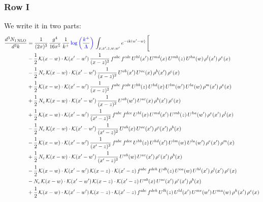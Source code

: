 \documentclass[9pt]{article}
\numberwithin{equation}{section}
\begin{document}
\subsubsection{Row I}
We write it in two parts: 
\begin{align}
\frac{d^{3}N_{1\,\mathrm{NLO}}}{d^{3}k} & = \frac{1}{(2\pi)^{3}}\,\frac{g^{4}}{16\pi^{5}}\,\frac{1}{k^{+}}\,{\color{blue}\log{\left(\frac{k^{+}}{\Lambda}\right)}}\,\int_{x,x',z,w,w'}e^{-ik(w'-w)}\,\Bigg[\notag\\ & -\frac{1}{2}\,\mathcal{K}(x-w)\cdot\mathcal{K}(x'-w')\,\frac{1}{(x-z)^{2}}\,f^{abc}\,f^{cde}\,U^{hl}(x')\,U^{md}(x)\,U^{mb}(z)\,U^{ha}(w)\,\rho^{l}(x')\,\rho^{e}(x)\notag\\
& -\frac{1}{2}\,N_{c}\,\mathcal{K}(x-w)\cdot\mathcal{K}(x'-w')\,\frac{1}{(x-z)^{2}}\,U^{ab}(x')\,U^{ac}(x)\,\rho^{b}(x')\,\rho^{c}(x)\notag\\
& +\frac{1}{2}\,\mathcal{K}(x-w)\cdot\mathcal{K}(x'-w')\,\frac{1}{(x-z)^{2}}\,f^{abc}\,f^{cde}\,U^{hb}(z)\,U^{hd}(x)\,U^{lm}(w')\,U^{la}(w)\,\rho^{m}(x')\,\rho^{e}(x)\notag\\
& +\frac{1}{2}\,N_{c}\,\mathcal{K}(x-w)\cdot\mathcal{K}(x'-w')\,\frac{1}{(x-z)^{2}}\,U^{ab}(w')\,U^{ac}(x)\,\rho^{b}(x')\,\rho^{c}(x)\notag\\
& +\frac{1}{2}\,\mathcal{K}(x-w)\cdot\mathcal{K}(x'-w')\,\frac{1}{(x'-z)^{2}}\,f^{abc}\,f^{dce}\,U^{hl}(x)\,U^{md}(x')\,U^{mb}(z)\,U^{ha}(w')\,\rho^{e}(x')\,\rho^{l}(x)\notag\\
& -\frac{1}{2}\,N_{c}\,\mathcal{K}(x-w)\cdot\mathcal{K}(x'-w')\,\frac{1}{(x'-z)^{2}}\,U^{ab}(x)\,U^{ac}(x')\,\rho^{c}(x')\,\rho^{b}(x)\notag\\
& -\frac{1}{2}\,\mathcal{K}(x-w)\cdot\mathcal{K}(x'-w')\,\frac{1}{(x'-z)^{2}}\,f^{abc}\,f^{dce}\,U^{hb}(z)\,U^{hd}(x')\,U^{lm}(w)\,U^{la}(w')\,\rho^{e}(x')\,\rho^{m}(x)\notag\\
& +\frac{1}{2}\,N_{c}\,\mathcal{K}(x-w)\cdot\mathcal{K}(x'-w')\,\frac{1}{(x'-z)^{2}}\,U^{ab}(w)\,U^{ac}(x')\,\rho^{c}(x')\,\rho^{b}(x)\notag\\
& -\frac{1}{2}\,\mathcal{K}(x-w)\cdot\mathcal{K}(x'-w')\,\mathcal{K}(x-z)\cdot\mathcal{K}(x'-z)\,f^{abc}\,f^{deh}\,U^{db}(z)\,U^{ea}(w)\,U^{hl}(x')\,\rho^{l}(x')\,\rho^{c}(x)\notag\\
& -N_{c}\,\mathcal{K}(x-w)\cdot\mathcal{K}(x'-w')\,\mathcal{K}(x-z)\cdot\mathcal{K}(x'-z)\,U^{ab}(x)\,U^{ac}(x')\,\rho^{c}(x')\,\rho^{b}(x)\notag\\
& +\frac{1}{2}\,\mathcal{K}(x-w)\cdot\mathcal{K}(x'-w')\,\mathcal{K}(x-z)\cdot\mathcal{K}(x'-z)\,f^{abc}\,f^{deh}\,U^{lb}(z)\,U^{ld}(x')\,U^{me}(w')\,U^{ma}(w)\,\rho^{h}(x')\,\rho^{c}(x)\notag\\

\end{align}
\end{document}
